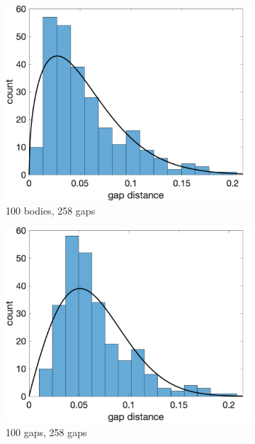 \documentclass[preprint,10pt]{elsarticle}
\begin{document}
\begin{figure}[H]
\begin{subfigure}[b]{0.3\textwidth}
\includegraphics*[width =\linewidth]{./figs/hist100b_1}
\caption{100 bodies, 258 gaps}
\end{subfigure}%
\begin{subfigure}[b]{0.3\textwidth}
\includegraphics*[width =\linewidth]{./figs/hist100b_46}
\caption{100 gaps, 258 gaps}
\end{subfigure}%
\begin{subfigure}[b]{0.3\textwidth}

\end{subfigure}
\end{figure}
\end{document}

